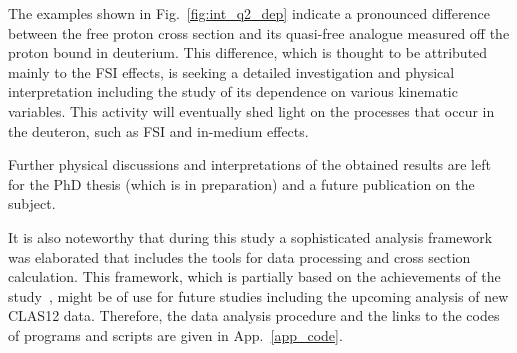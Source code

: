 

The examples shown in Fig.~\ref{fig:int_q2_dep} indicate a pronounced difference between the free proton cross section and its quasi-free analogue measured off the proton bound in deuterium. This difference, which is thought to be attributed mainly to the FSI effects, is seeking a detailed investigation and physical interpretation including the study of its dependence on various kinematic variables. This activity will eventually shed light on the processes that occur in the deuteron, such as FSI and in-medium effects.

Further physical discussions and interpretations of the obtained results are left for the PhD thesis (which is in preparation) and a future publication on the subject.


It is also noteworthy that during this study a sophisticated analysis framework was elaborated that includes the tools for data processing and cross section calculation. This framework, which is partially based on the achievements of the study~\cite{Fed_an_note:2017,Fed_paper_2018}, might be of use for future studies including the upcoming analysis of new CLAS12 data. Therefore, the data analysis procedure and the links to the codes of programs and scripts are given in App.~\ref{app_code}.



